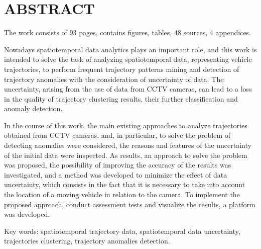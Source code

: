 \chapter*{ABSTRACT}

The work consists of 93 pages, contains  figures,  tables, 48 sources, 4 appendices.

Nowadays spatiotemporal data analytics plays an important role, and this work is intended to solve the task of analyzing spatiotemporal data, representing vehicle trajectories, to perform frequent trajectory patterns mining and detection of trajectory anomalies with the consideration of uncertainty of data. The uncertainty, arising from the use of data from CCTV cameras, can lead to a loss in the quality of trajectory clustering results, their further classification and anomaly detection.

In the course of this work, the main existing approaches to analyze trajectories obtained from CCTV cameras, and, in particular, to solve the problem of detecting anomalies were considered, the reasons and features of the uncertainty of the initial data were inspected. As results, an approach to solve the problem was proposed, the possibility of improving the accuracy of the results was investigated, and a method was developed to minimize the effect of data uncertainty, which consists in the fact that it is necessary to take into account the location of a moving vehicle in relation to the camera. To implement the proposed approach, conduct assessment tests and visualize the results, a platform was developed.

\bigbreak
Key words: spatiotemporal trajectory data, spatiotemporal data uncertainty, trajectories clustering, trajectory anomalies detection.